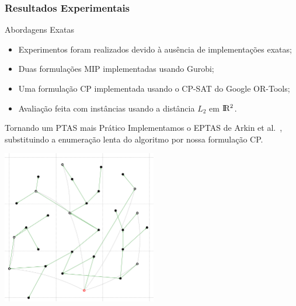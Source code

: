 
\subsubsection{Resultados Experimentais}

\begin{frame}{Abordagens Exatas}
  \begin{itemize}[<+->]

    \item Experimentos foram realizados devido à ausência de implementações exatas;

    \item Duas formulações MIP implementadas usando Gurobi;

    \item Uma formulação CP implementada usando o CP-SAT do Google OR-Tools;

    \item Avaliação feita com instâncias usando a distância $L_2$ em $\rm I\!R^2$.

  \end{itemize}
\end{frame}

\begin{frame}{Tornando um PTAS mais Prático}
  Implementamos o EPTAS de Arkin et al.~\cite{Arkin06}, substituindo a enumeração lenta do algoritmo por nossa formulação CP.

  \bigskip
  \begin{minipage}{\linewidth}
    \centering
    \includegraphics[height=6.7cm]{FTP/ptas_solver.png}
  \end{minipage}
\end{frame}
